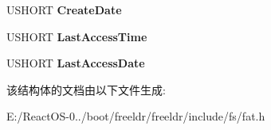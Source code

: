 \begin{DoxyCompactItemize}
\item 
\mbox{\label{struct_f_a_t_x___d_i_r_e_n_t_r_y_a87a1b4f1e24158eb54295759c2450dcb}} 
U\+S\+H\+O\+RT {\bfseries Create\+Date}
\item 
\mbox{\label{struct_f_a_t_x___d_i_r_e_n_t_r_y_a6845c900f37c4bedc0f4c4b5f451fd3f}} 
U\+S\+H\+O\+RT {\bfseries Last\+Access\+Time}
\item 
\mbox{\label{struct_f_a_t_x___d_i_r_e_n_t_r_y_a8f1a27eff88c7c185a91a4d72da3bb15}} 
U\+S\+H\+O\+RT {\bfseries Last\+Access\+Date}
\end{DoxyCompactItemize}


该结构体的文档由以下文件生成\+:\begin{DoxyCompactItemize}
\item 
E\+:/\+React\+O\+S-\/0../boot/freeldr/freeldr/include/fs/fat.\+h\end{DoxyCompactItemize}
